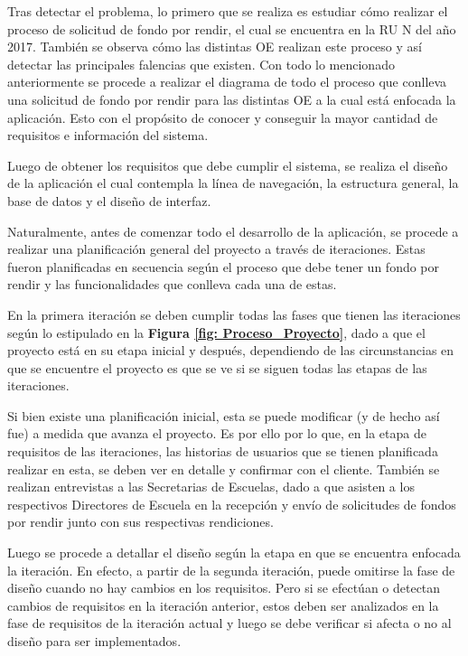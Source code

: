 Tras detectar el problema, lo primero que se realiza es estudiar cómo realizar el proceso de solicitud de fondo por rendir, el cual se encuentra en la RU N del año 2017. También se observa cómo las distintas OE realizan este proceso y así detectar las principales falencias que existen. Con todo lo mencionado anteriormente se procede a realizar el diagrama de todo el proceso que conlleva una solicitud de fondo por rendir para las distintas OE a la cual está enfocada la aplicación. Esto con el propósito de conocer y conseguir la mayor cantidad de requisitos e información del sistema.

Luego de obtener los requisitos que debe cumplir el sistema, se realiza el diseño de la aplicación el cual contempla la línea de navegación, la estructura general, la base de datos y el diseño de interfaz.

Naturalmente, antes de comenzar todo el desarrollo de la aplicación, se procede a realizar una planificación general del proyecto a través de iteraciones. Estas fueron planificadas en secuencia según el proceso que debe tener un fondo por rendir y las funcionalidades que conlleva cada una de estas.

En la primera iteración se deben cumplir todas las fases que tienen las iteraciones según lo estipulado en la \textbf{Figura \ref{fig: Proceso_Proyecto}}, dado a que el proyecto está en su etapa inicial y después, dependiendo de las circunstancias en que se encuentre el proyecto es que se ve si se siguen todas las etapas de las iteraciones. 

Si bien existe una planificación inicial, esta se puede modificar (y de hecho así fue) a medida que avanza el proyecto. Es por ello por lo que, en la etapa de requisitos de las iteraciones, las historias de usuarios que se tienen planificada realizar en esta, se deben ver en detalle y confirmar con el cliente. También se realizan entrevistas a las Secretarias de Escuelas, dado a que asisten a los respectivos Directores de Escuela en la recepción y envío de solicitudes de fondos por rendir junto con sus respectivas rendiciones.

Luego se procede a detallar el diseño según la etapa en que se encuentra enfocada la iteración. En efecto, a partir de la segunda iteración, puede omitirse la fase de diseño cuando no hay cambios en los requisitos. Pero si se efectúan o detectan cambios de requisitos en la iteración anterior, estos deben ser analizados en la fase de requisitos de la iteración actual y luego se debe verificar si afecta o no al diseño para ser implementados.

